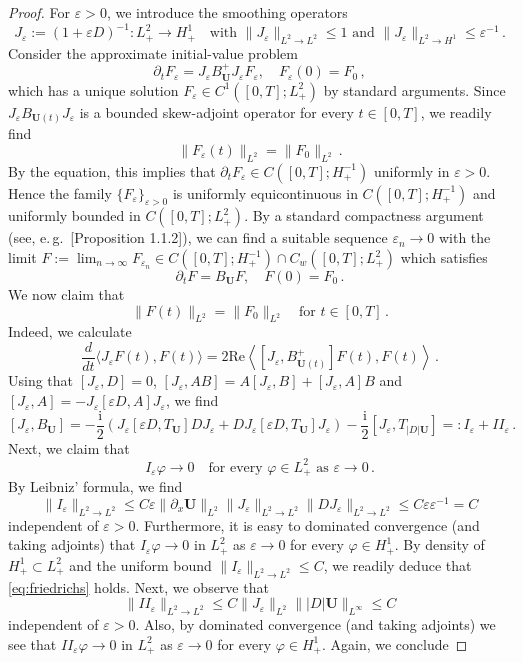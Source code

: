 \documentclass[11pt,reqno]{amsart}
\theoremstyle{definition}
\theoremstyle{remark}
\theoremstyle{remark}
\numberwithin{equation}{section}
\newcommand{\pt}{\partial}
\newcommand{\be}{\begin{equation}}
\newcommand{\ee}{\end{equation}}
\newcommand{\eps}{\varepsilon}
\newcommand{\ii}{\mathrm{i}}
\newcommand{\Ub}{\mathbf{U}}
\renewcommand{\phi}{\varphi}
\begin{document}
\begin{appendix}
\begin{proof}
For $\eps > 0$, we introduce the smoothing operators
$$
J_\eps := (1+\eps D)^{-1} : L^2_+ \to H^1_+ \quad \mbox{with $\| J_\eps \|_{L^2 \to L^2} \leq 1$ and $\| J_\eps \|_{L^2 \to H^1} \leq \eps^{-1}$} \, .
$$
Consider the approximate initial-value problem
\be
\pt_t F_\eps = J_\eps B_{\Ub}^+ J_\eps F_\eps, \quad F_\eps(0) = F_0 \, ,
\ee
which has a unique solution $F_\eps \in C^1([0,T]; L^2_+)$ by standard arguments. Since $J_\eps B_{\Ub(t)} J_\eps$ is a bounded skew-adjoint operator for every $t \in [0,T]$, we readily find
$$
\| F_\eps(t) \|_{L^2} = \| F_0 \|_{L^2} \, .
$$
By the equation, this implies that $\pt_t F_\eps \in C([0,T]; H^{-1}_+)$ uniformly in $\eps>0$. Hence the family $\{ F_\eps \}_{\eps > 0}$ is uniformly equicontinuous in $C([0,T]; H^{-1}_+)$ and uniformly bounded in $C([0,T]; L^2_+)$. By a standard compactness argument (see, e.\,g.~\cite{Ca-03}[Proposition 1.1.2]), we can find a suitable sequence $\eps_n \to 0$ with the limit $F := \lim_{n \to \infty} F_{\eps_n} \in C([0,T]; H^{-1}_+) \cap C_w([0,T]; L^2_+)$ which satisfies
\be
\pt_t F = B_{\Ub} F, \quad F(0) = F_0 \, .
\ee
We now claim that 
\be \label{eq:L2_cons}
\| F(t) \|_{L^2} = \| F_0 \|_{L^2} \quad \mbox{for $t \in [0,T]$} \, .
\ee
Indeed, we calculate
\be \label{ineq:L2_cons}
\frac{d}{dt} \langle J_\eps F(t), F(t) \rangle = 2 \mathrm{Re} \left \langle [J_\eps, B_{\Ub(t)}^+] F(t), F(t) \right \rangle \, .
\ee
Using that $[J_\eps, D] = 0$, $[J_\eps, AB] = A[J_\eps, B] + [J_\eps, A]B$ and $[J_\eps,A] = -J_\eps[\eps D, A]J_\eps$, we find
$$
[J_\eps, B_\Ub] = -\frac{\ii}{2} \left ( J_\eps [\eps D, T_{\Ub}] D J_\eps + D J_\eps [\eps D, T_\Ub] J_\eps \right ) - \frac{\ii}{2} [ J_\eps, T_{|D| \Ub}]  =: I_\eps + II_\eps \, .
$$
Next, we claim that
\be \label{eq:friedrichs}
I_\eps \phi \to 0 \quad \mbox{for every $\phi \in L^2_+$ as $\eps \to 0$} \, .
\ee
By Leibniz' formula, we find
$$
\| I_\eps \|_{L^2 \to L^2} \leq C \eps \| \pt_x \Ub \|_{L^2} \| J_\eps \|_{L^2 \to L^2} \| D J_\eps \|_{L^2 \to L^2} \leq C \eps \eps^{-1} = C
$$
independent of $\eps > 0$. Furthermore, it is easy to dominated convergence (and taking adjoints) that $I_\eps \phi \to 0$ in $L^2_+$ as $\eps \to 0$ for every $\phi \in H^{1}_+$. By density of $H^1_+ \subset L^2_+$ and the uniform bound $\| I_\eps \|_{L^2 \to L^2} \leq C$, we readily deduce that \eqref{eq:friedrichs} holds. Next, we observe that
$$
\|II_\eps \|_{L^2 \to L^2} \leq C \| J_\eps \|_{L^2} \| |D| \Ub \|_{L^\infty} \leq C
$$
independent of $\eps > 0$. Also, by dominated convergence (and taking adjoints) we see that $II_\eps \phi \to 0$ in $L^2_+$ as $\eps \to 0$ for every $\phi \in H^1_+$. Again, we conclude

\end{proof}
\end{appendix}
\end{document}
